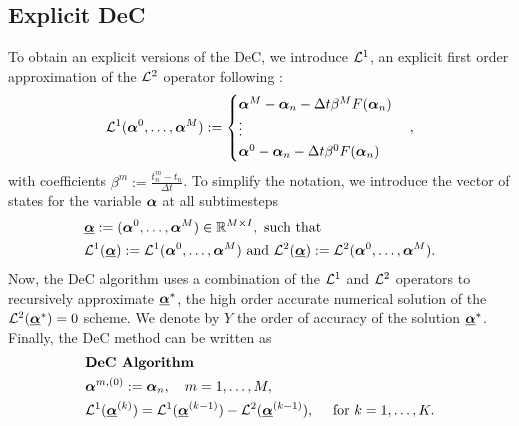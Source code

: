 \subsection{Explicit DeC}
To obtain an explicit versions of the DeC, we introduce $\mathcal L^1$, an explicit first order approximation of the $\mathcal L^2$ operator following \cite{abgrall2017dec, offner2023approximation}:
\begin{equation}\label{eq:L1}
\mathcal L^1(\boldsymbol{\alpha}^0, \dots, \boldsymbol{\alpha}^M) :=
\begin{cases}
\boldsymbol{\alpha}^M-\boldsymbol{\alpha}_n -  \Delta t\beta^M F(\boldsymbol{\alpha}_n) \\
\vdots\\
\boldsymbol{\alpha}^0- \boldsymbol{\alpha}_n -  \Delta t \beta^0 F(\boldsymbol{\alpha}_n)
\end{cases},
\end{equation}
with coefficients $\beta^m:= \frac{t_n^m-t_n}{\Delta t}$.
To simplify the notation, we introduce the vector of states for the variable $\boldsymbol{\alpha}$ at all subtimesteps
\begin{align}\label{eq:definition_bbc}
&\underline{\boldsymbol{\alpha}} :=  (\boldsymbol{\alpha}^0, \dots, \boldsymbol{\alpha} ^M) \in \mathbb R^{M\times I}, \text{ such that }\\
&\mathcal L^1(\underline{\boldsymbol{\alpha}}) := \mathcal L^1(\boldsymbol{\alpha}^0, \dots, \boldsymbol{\alpha}^M) \text{ and } \mathcal L^2(\underline{\boldsymbol{\alpha}}) := \mathcal L^2(\boldsymbol{\alpha}^0, \dots, \boldsymbol{\alpha}^M) .
\end{align}
Now, the DeC algorithm uses a combination of the $\mathcal L^1$ and $\mathcal L^2$ operators to recursively approximate $\underline{\boldsymbol{\alpha}}^*$, the high order accurate numerical solution of
the $\mathcal L^2(\underline{\boldsymbol{\alpha}}^*)=0$ scheme. We denote by $Y$ the order of accuracy of the solution $\underline{\boldsymbol{\alpha}}^*$. 
Finally, the DeC method can be written as
\begin{equation}\label{DeC_method}
\begin{split}
&\text{\textbf{DeC Algorithm}}\\
&\boldsymbol{\alpha}^{m,(0)}:=\boldsymbol{\alpha}_n,\quad m=1,\dots, M,\\
&\mathcal L^1(\underline{\boldsymbol{\alpha}}^{(k)})=\mathcal L^1(\underline{\boldsymbol{\alpha}}^{(k-1)})-\mathcal L^2(\underline{\boldsymbol{\alpha}}^{(k-1)}), \quad \text{ for }k=1,\dots,K.
\end{split}
\end{equation}
